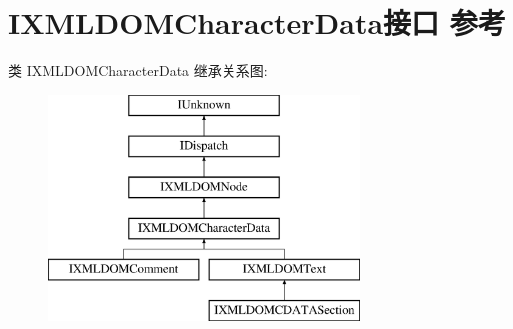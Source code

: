 \hypertarget{interface_i_x_m_l_d_o_m_character_data}{}\section{I\+X\+M\+L\+D\+O\+M\+Character\+Data接口 参考}
\label{interface_i_x_m_l_d_o_m_character_data}
类 I\+X\+M\+L\+D\+O\+M\+Character\+Data 继承关系图\+:\begin{figure}[H]
\begin{center}
\leavevmode
\includegraphics[height=6.000000cm]{interface_i_x_m_l_d_o_m_character_data}
\end{center}
\end{figure}
